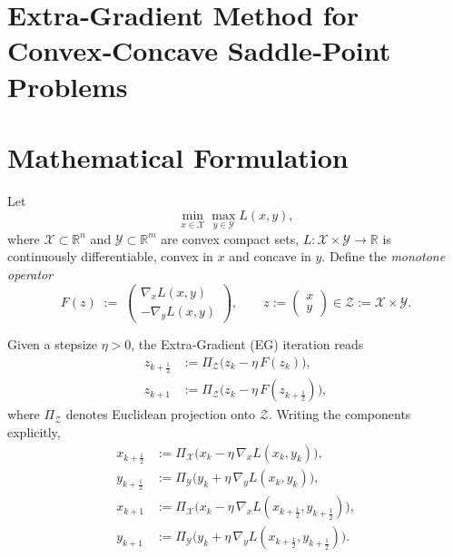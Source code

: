\documentclass{article}
\newcommand{\R}{\mathbb{R}}
\begin{document}
\section*{Extra‑Gradient Method for Convex‑Concave Saddle‑Point Problems}

\section*{Mathematical Formulation}
Let 
\[
\min_{x\in\mathcal X}\max_{y\in\mathcal Y} L(x,y),
\]
where $\mathcal X\subset\R^{n}$ and $\mathcal Y\subset\R^{m}$ are convex compact sets,
$L:\mathcal X\times\mathcal Y\to\R$ is continuously differentiable,
convex in $x$ and concave in $y$.
Define the \emph{monotone operator}
\[
F(z)\;:=\;
\begin{pmatrix}
\nabla_{x}L(x,y)\\[2mm]
-\nabla_{y}L(x,y)
\end{pmatrix},
\qquad 
z:=\begin{pmatrix}x\\y\end{pmatrix}\in\mathcal Z:=\mathcal X\times\mathcal Y .
\]

Given a stepsize $\eta>0$, the Extra‑Gradient (EG) iteration reads
\[
\begin{aligned}
z_{k+\frac12}&:=\Pi_{\mathcal Z}\!\bigl(z_{k}-\eta\,F(z_{k})\bigr), \tag{1}\\[1mm]
z_{k+1}&:=\Pi_{\mathcal Z}\!\bigl(z_{k}-\eta\,F(z_{k+\frac12})\bigr), \tag{2}
\end{aligned}
\]
where $\Pi_{\mathcal Z}$ denotes Euclidean projection onto $\mathcal Z$.
Writing the components explicitly,
\[
\begin{aligned}
x_{k+\frac12}&:=\Pi_{\mathcal X}\!\bigl(x_{k}-\eta\,\nabla_{x}L(x_{k},y_{k})\bigr),\\
y_{k+\frac12}&:=\Pi_{\mathcal Y}\!\bigl(y_{k}+\eta\,\nabla_{y}L(x_{k},y_{k})\bigr),\\[1mm]
x_{k+1}&:=\Pi_{\mathcal X}\!\bigl(x_{k}-\eta\,\nabla_{x}L(x_{k+\frac12},y_{k+\frac12})\bigr),\\
y_{k+1}&:=\Pi_{\mathcal Y}\!\bigl(y_{k}+\eta\,\nabla_{y}L(x_{k+\frac12},y_{k+\frac12})\bigr).
\end{aligned}
\]
\end{document}
